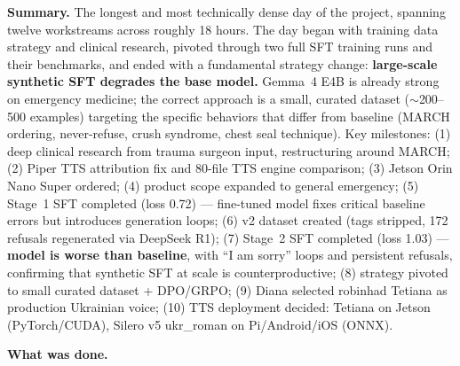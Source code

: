 \documentclass{article}
\theoremstyle{plain}
\theoremstyle{definition}
\theoremstyle{remark}
\begin{document}
\textbf{Summary.} The longest and most technically dense day of the project, spanning twelve workstreams across roughly 18 hours. The day began with training data strategy and clinical research, pivoted through two full SFT training runs and their benchmarks, and ended with a fundamental strategy change: \textbf{large-scale synthetic SFT degrades the base model.} Gemma~4 E4B is already strong on emergency medicine; the correct approach is a small, curated dataset ($\sim$200--500 examples) targeting the specific behaviors that differ from baseline (MARCH ordering, never-refuse, crush syndrome, chest seal technique). Key milestones: (1) deep clinical research from trauma surgeon input, restructuring around MARCH; (2) Piper TTS attribution fix and 80-file TTS engine comparison; (3) Jetson Orin Nano Super ordered; (4) product scope expanded to general emergency; (5) Stage~1 SFT completed (loss 0.72) --- fine-tuned model fixes critical baseline errors but introduces generation loops; (6) v2 dataset created (tags stripped, 172 refusals regenerated via DeepSeek R1); (7) Stage~2 SFT completed (loss 1.03) --- \textbf{model is worse than baseline}, with ``I am sorry'' loops and persistent refusals, confirming that synthetic SFT at scale is counterproductive; (8) strategy pivoted to small curated dataset + DPO/GRPO; (9) Diana selected robinhad Tetiana as production Ukrainian voice; (10) TTS deployment decided: Tetiana on Jetson (PyTorch/CUDA), Silero v5 ukr\_roman on Pi/Android/iOS (ONNX).

\textbf{What was done.}
\end{document}
